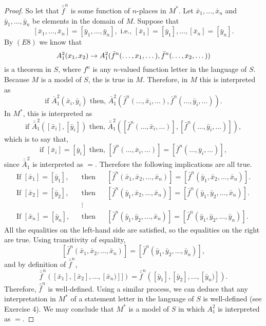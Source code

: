 \begin{proposition}
\begin{proof}
    So let that \(\bar{\bar{f}}^n\) is some function of \(n\)-places in \(M^*\). Let \(\bar{x}_1, \dots, \bar{x}_n\) and \(\bar{y}_1, \dots, \bar{y}_n\) be elements in the domain of \(M\). Suppose that
    \[[\bar{x}_1, \dots, \bar{x}_n] = [\bar{y}_1, \dots, \bar{y}_n], \text{ i.e., } [\bar{x}_1] = [\bar{y}_1], \dots, [\bar{x}_n] = [\bar{y}_n].\]
    By \((E8)\) we know that
    \[A^2_1(x_1, x_2) \rightarrow A^2_1(\bar{f}^n(\dots, x_1, \dots), \bar{f}^n(\dots, x_2, \dots))\]
    is a theorem in \(S\), where \(f^n\) is any \(n\)-valued function letter in the language of \(S\). Because \(M\) is a model of \(S\), the \wf{} is true in \(M\). Therefore, in \(M\) this is interpreted as
    \[\text{if }\bar{A}^2_1(\bar{x}_i, \bar{y}_i) \text{ then, } \bar{A}^2_1(\bar{f}^n(\dots, \bar{x}_i, \dots), \bar{f}^n(\dots, \bar{y}_i, \dots)).\]
    In \(M^*\), this is interpreted as
    \[\text{if }\bar{\bar{A}}^2_1([\bar{x}_i], [\bar{y}_i]) \text{ then, } \bar{\bar{A}}^2_1([\bar{f}^n(\dots, \bar{x}_i, \dots)], [\bar{f}^n(\dots, \bar{y}_i, \dots)]),\]
    which is to say that, 
    \[\text{if }[\bar{x}_i] = [\bar{y}_i] \text{ then, } [\bar{f}^n(\dots, \bar{x}_i, \dots)] = [\bar{f}^n(\dots, \bar{y}_i, \dots)],\]
    since \(\bar{\bar{A}}^2_1\) is interpreted as \(=\). Therefore the following implications are all true.
    \begin{align*}
      \text{If } [\bar{x}_1] = [\bar{y}_1],&&
      \text{then}&&
      [\bar{f}^n(\bar{x}_1, \bar{x}_2, \dots, \bar{x}_n)] = [\bar{f}^n(\bar{y}_1, \bar{x}_2, \dots, \bar{x}_n)].\\
      \text{If } [\bar{x}_2] = [\bar{y}_2],&&
      \text{then}&&
      [\bar{f}^n(\bar{y}_1, \bar{x}_2, \dots, \bar{x}_n)] = [\bar{f}^n(\bar{y}_1, \bar{y}_2, \dots, \bar{x}_n)].\\
      &&
      \vdots&&
      \\
      \text{If } [\bar{x}_n] = [\bar{y}_n],&&
      \text{then}&&
      [\bar{f}^n(\bar{y}_1, \bar{y}_2, \dots, \bar{x}_n)] = [\bar{f}^n(\bar{y}_1, \bar{y}_2, \dots, \bar{y}_n)].
    \end{align*}
    All the equalities on the left-hand side are satisfied, so the equalities on the right are true. Using transitivity of equality,
    \[[\bar{f}^n(\bar{x}_1, \bar{x}_2, \dots, \bar{x}_n)] = [\bar{f}^n(\bar{y}_1, \bar{y}_2, \dots, \bar{y}_n)],\]
    and by definition of \(\bar{\bar{f}}^n\),
    \[\bar{\bar{f}}^n([\bar{x}_1], [\bar{x}_2], \dots, [\bar{x}_n)]]) = \bar{\bar{f}}^n([\bar{y}_1], [\bar{y}_2], \dots, [\bar{y}_n)]).\]
    Therefore, \(\bar{\bar{f}}^n\) is well-defined. Using a similar process, we can deduce that any interpretation in \(M^*\) of a statement letter in the language of \(S\) is well-defined (see Exercise 4). We may conclude that \(M^*\) is a model of \(S\) in which \(A^2_1\) is interpreted as \(=\).
  \end{proof}
\end{proposition}

